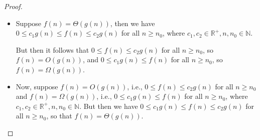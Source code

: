 \begin{proof}
  \begin{itemize}
    \item[$(\Rightarrow)$] Suppose $f(n) = \Theta(g(n))$, then we have
      $0 \leq c_1 g(n) \leq f(n) \leq c_2 g(n)$ for all $n \geq n_0$,
      where $c_1, c_2 \in \mathbb{R}^+, n, n_0 \in \mathbb{N}$.

      But then it follows that $0 \leq f(n) \leq c_2 g(n)$ for all $n \geq n_0$,
      so $f(n) = O(g(n))$, and $0 \leq c_1 g(n) \leq f(n)$ for all $n \geq n_0$,
      so $f(n) = \Omega(g(n))$.

    \item[$(\Leftarrow)$]
      Now, suppose $f(n) = O(g(n))$, i.e., $0 \leq f(n) \leq c_2 g(n)$ for all
      $n \geq n_0$ and $f(n) = \Omega(g(n))$, i.e., $0 \leq c_1 g(n) \leq f(n)$
      for all $n \geq n_0$, where $c_1, c_2 \in \mathbb{R}^+, n, n_0
      \in \mathbb{N}$.
      But then we have $0 \leq c_1 g(n) \leq f(n) \leq c_2 g(n)$ for
      all $n \geq n_0$,
      so that $f(n) = \Theta(g(n))$.
  \end{itemize}
\end{proof}
